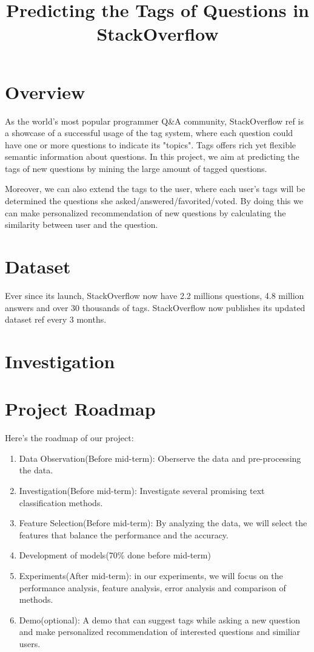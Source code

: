 \documentclass{article} %
\title{Predicting the Tags of Questions in StackOverflow}
\begin{document}
\maketitle
\section{Overview}
As the world's most popular programmer Q\&A community, StackOverflow {ref} is a showcase of a successful usage of the tag system, where each question could have one or more questions to indicate its "topics". Tags offers rich yet flexible semantic information about questions. In this project, we aim at predicting the tags of new questions by mining the large amount of tagged questions.

Moreover, we can also extend the tags to the user, where each user's tags will be determined the questions she asked/answered/favorited/voted. By doing this we can make personalized recommendation of new questions by calculating the similarity between user and the question.

\section{Dataset}
Ever since its launch, StackOverflow now have 2.2 millions questions, 4.8 million answers and over 30 thousands of tags. StackOverflow now publishes its updated dataset {ref} every 3 months.

\section{Investigation}

\section{Project Roadmap}
Here's the roadmap of our project:
\begin{enumerate}
    \item Data Observation(Before mid-term): Oberserve the data and pre-processing the data.
    \item Investigation(Before mid-term): Investigate several promising text classification methods.
    \item Feature Selection(Before mid-term): By analyzing the data, we will select the features that balance the performance and the accuracy.
    \item Development of models(70\% done before mid-term)
    \item Experiments(After mid-term): in our experiments, we will focus on the performance analysis, feature analysis, error analysis and comparison of methods.
    \item Demo(optional): A demo that can suggest tags while asking a new question and make personalized recommendation of interested questions and similiar users.
\end{enumerate}
\end{document}
